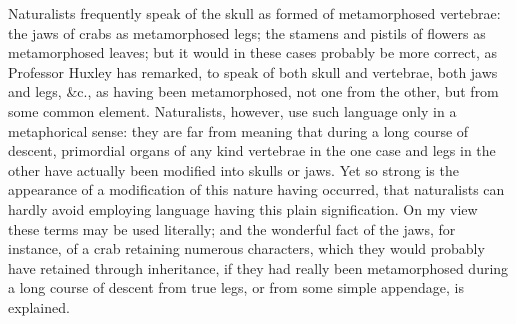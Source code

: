 \indent Naturalists frequently speak of the skull as formed of metamorphosed vertebrae: the jaws of crabs as metamorphosed legs; the stamens and pistils of flowers as metamorphosed leaves; but it would in these cases probably be more correct, as Professor Huxley has remarked, to speak of both skull and vertebrae, both jaws and legs, \&c., as having been metamorphosed, not one from the other, but from some common element. Naturalists, however, use such language only in a metaphorical sense: they are far from meaning that during a long course of descent, primordial organs of any kind vertebrae in the one case and legs in the other have actually been modified into skulls or jaws. Yet so strong is the appearance of a modification of this nature having occurred, that naturalists can hardly avoid employing language having this plain signification. On my view these terms may be used literally; and the wonderful fact of the jaws, for instance, of a crab retaining numerous characters, which they would probably have retained through inheritance, if they had really been metamorphosed during a long course of descent from true legs, or from some simple appendage, is explained.~\\

